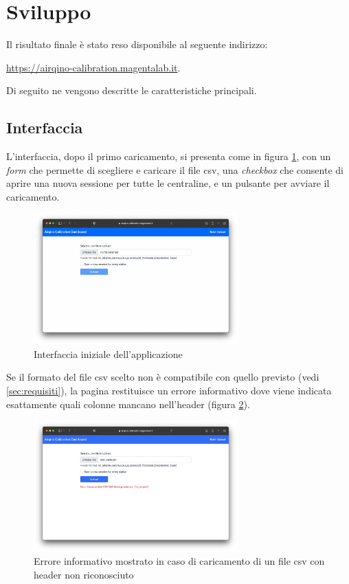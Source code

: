 \section{Sviluppo}\label{sec:sviluppo}
Il risultato finale è stato reso disponibile al seguente indirizzo:\

\url{https://airqino-calibration.magentalab.it}.

Di seguito ne vengono descritte le caratteristiche principali.

\subsection{Interfaccia}\label{sec:interfaccia}

L'interfaccia, dopo il primo caricamento, si presenta come in figura \ref{fig:interfaccia-1}, con un \textit{form} che permette di scegliere e caricare il file csv, una \textit{checkbox} che consente di aprire una nuova sessione per tutte le centraline, e un pulsante per avviare il caricamento.
\begin{figure}[H]
\centering
\includegraphics[width=0.70\textwidth,height=\textheight,keepaspectratio]{img/interfaccia_1}
\caption{Interfaccia iniziale dell'applicazione}
\label{fig:interfaccia-1}
\end{figure}

Se il formato del file csv scelto non è compatibile con quello previsto (vedi \ref{sec:requisiti}), la pagina restituisce un errore informativo dove viene indicata esattamente quali colonne mancano nell'header (figura \ref{fig:interfaccia-8}).

\begin{figure}[H]
\centering
\includegraphics[width=0.70\textwidth,height=\textheight,keepaspectratio]{img/interfaccia_8}
\caption{Errore informativo mostrato in caso di caricamento di un file csv con header non riconosciuto}
\label{fig:interfaccia-8}
\end{figure}

